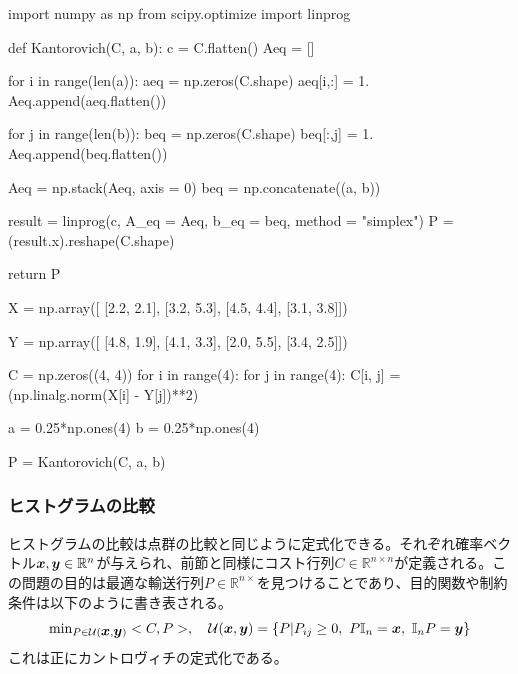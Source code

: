 \documentclass[dvipdfmx, 9pt, a4paper]{jsarticle}
\newcommand{\bm}[1]{{\mbox{\boldmath $#1$}}}
\begin{document}
\begin{python}
import numpy as np
from scipy.optimize import linprog

def Kantorovich(C, a, b):
	c = C.flatten()
	Aeq = []

	for i in range(len(a)):
		aeq = np.zeros(C.shape)
		aeq[i,:] = 1.
		Aeq.append(aeq.flatten())

	for j in range(len(b)):
		beq = np.zeros(C.shape)
		beq[:,j] = 1.
		Aeq.append(beq.flatten())

	Aeq = np.stack(Aeq, axis = 0)
	beq = np.concatenate((a, b))

	result = linprog(c, A_eq = Aeq, b_eq = beq, method = "simplex")
	P = (result.x).reshape(C.shape)

	return P

X = np.array([
	[2.2, 2.1],
	[3.2, 5.3],
	[4.5, 4.4],
	[3.1, 3.8]])

Y = np.array([
	[4.8, 1.9],
	[4.1, 3.3],
	[2.0, 5.5],
	[3.4, 2.5]])

C = np.zeros((4, 4))
for i in range(4):
	for j in range(4):
		C[i, j] = (np.linalg.norm(X[i] - Y[j])**2)

a = 0.25*np.ones(4)
b = 0.25*np.ones(4)

P = Kantorovich(C, a, b)
\end{python}

\subsubsection{ヒストグラムの比較}
ヒストグラムの比較は点群の比較と同じように定式化できる。それぞれ確率ベクトル$\bm x, \bm y \in \mathbb{R}^n$が与えられ、前節と同様にコスト行列$C \in \mathbb{R}^{n \times n}$が定義される。この問題の目的は最適な輸送行列$P \in \mathbb{R}^{n \times}$を見つけることであり、目的関数や制約条件は以下のように書き表される。
\begin{equation}
{\rm min}_{P \in {\mathcal{U}(\bm x, \bm y)}}<C, P>,~~~\mathcal{U}(\bm x, \bm y)=\{P|P_{ij}\geq 0,~P\mathbb{I}_n=\bm x,~\mathbb{I}_nP=\bm y\} \notag
\end{equation}
これは正にカントロヴィチの定式化である。
\end{document}
